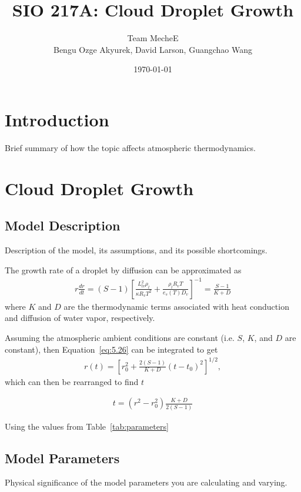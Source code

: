 \documentclass[]{article}
\title{SIO 217A: Cloud Droplet Growth}
\author{Team MecheE \\ Bengu Ozge Akyurek, David Larson, Guangchao Wang}
\date{\today}
\begin{document}
\maketitle


\section{Introduction}
Brief summary of how the topic affects atmospheric thermodynamics.


\section{Cloud Droplet Growth}

\subsection{Model Description}
Description of the model, its assumptions, and its possible shortcomings.


The growth rate of a droplet by diffusion can be approximated as
\begin{align}
    \label{eq:5.26}
    r \frac{dr}{dt} = (S - 1) \left[ \frac{L_{lv}^2 \rho_l}{\kappa R_v T^2} + \frac{\rho_l R_v T}{e_s(T) D_v} \right] ^{-1} = \frac{S - 1}{K + D}
\end{align}
where $K$ and $D$ are the thermodynamic terms associated with heat conduction
and diffusion of water vapor, respectively.

Assuming the atmospheric ambient conditions are constant (i.e. $S$, $K$, and
$D$ are constant), then Equation~\ref{eq:5.26} can be integrated to get
\begin{align}
    \label{eq:5.27}
    r(t) = \left[ r_0^2 + \frac{2(S -1)}{K + D}(t - t_0)^2 \right] ^{1/2},
\end{align}
which can then be rearranged to find $t$

\begin{align}
    t = (r^2 - r_0^2) \frac{K + D}{2(S - 1)}
\end{align}

Using the values from Table~\ref{tab:parameters}


\subsection{Model Parameters}
Physical significance of the model parameters you are calculating and varying.
\end{document}
